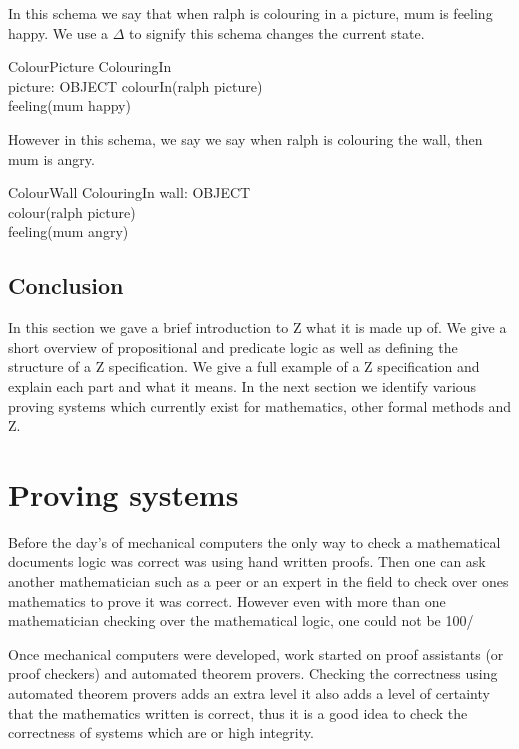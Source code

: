 In this schema we say that when ralph is colouring in a picture, mum is feeling happy. We use a $\Delta$ to signify this schema changes the current state.
\begin{schema}{ColourPicture}
\Delta ColouringIn \\
picture: OBJECT 
\where
colourIn(ralph \mapsto picture) \\
feeling(mum \mapsto happy)
\end{schema}

However in this schema, we say we say when ralph is colouring the wall, then mum is angry.
\begin{schema}{ColourWall}
\Delta ColouringIn
wall: OBJECT \\
\where
colour(ralph \mapsto picture) \\
feeling(mum \mapsto angry)
\end{schema}

\subsection{Conclusion}

In this section we gave a brief introduction to Z what it is made up of. We give a short overview of propositional and predicate logic as well as defining the structure of a Z specification. We give a full example of a Z specification and explain each part and what it means. In the next section we identify various proving systems which currently exist for mathematics, other formal methods and Z.

\section{Proving systems}

Before the day's of mechanical computers the only way to check a mathematical documents logic was correct was using hand written proofs. Then one can ask another mathematician such as a peer or an expert in the field to check over ones mathematics to prove it was correct. However even with more than one mathematician checking over the mathematical logic, one could not be 100/%

Once mechanical computers were developed, work started on proof assistants (or proof checkers) and automated theorem provers. Checking the correctness using automated theorem provers adds an extra level it also adds a level of certainty that the mathematics written is correct, thus it is a good idea to check the correctness of systems which are or high integrity.

